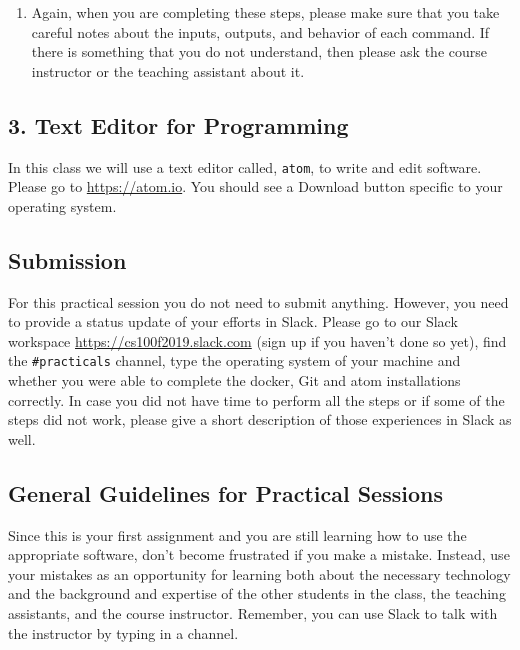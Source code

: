 \begin{enumerate}
  \item Again, when you are completing these steps, please make sure that you take careful notes about the inputs,
    outputs, and behavior of each command. If there is something that you do not understand, then please ask the course
    instructor or the teaching assistant about it.

\end{enumerate}


\subsection*{3. Text Editor for Programming}
In this class we will use a text editor called, {\tt atom}, to write and edit software. Please go to \url{https://atom.io}. You should see a Download button specific to your operating system.


\subsection*{Submission}
For this practical session you do not need to submit anything. However, you need to provide a status update of your efforts in Slack. Please go to our Slack workspace \url{https://cs100f2019.slack.com} (sign up if you haven't done so yet), find the {\tt \#practicals} channel, type the operating system of your machine and whether you were able to complete the docker, Git and atom installations correctly. In case you did not have time to perform all the steps or if some of the steps did not work, please give a short description of those experiences in Slack as well. 

\subsection*{General Guidelines for Practical Sessions}

\noindent Since this is your first  assignment and you are still learning how to use the appropriate software,
    don't become frustrated if you make a mistake. Instead, use your mistakes as an opportunity for learning both about
    the necessary technology and the background and expertise of the other students in the class, the teaching
    assistants, and the course instructor. Remember, you can use Slack to talk with the instructor by typing
     in a channel.
    
